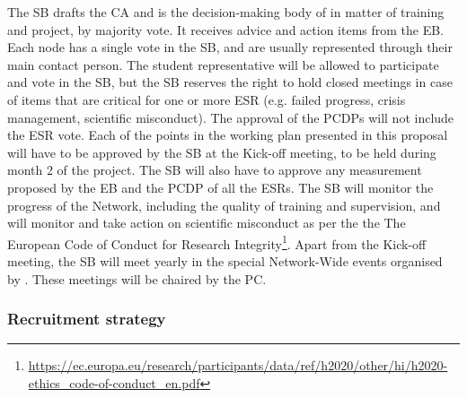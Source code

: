 The SB drafts the CA and is the decision-making body of \acronym in matter of training and project, by majority vote. 
It receives advice and action items from the EB. 
Each \acronym node has a single vote in the SB, and are usually represented through their main contact person.
The student representative will be allowed to participate and vote in the SB, but the SB reserves the right to hold closed meetings in case of items
that are critical for one or more ESR (e.g. failed progress, crisis management, scientific misconduct). The approval of the PCDPs will not include the ESR vote.
Each of the points in the working plan presented in this proposal will have to be approved by the SB
at the Kick-off meeting, to be held during month 2 of the project. The SB will also have to approve any measurement proposed by the EB and the PCDP of all the ESRs.
The SB will monitor the progress of the Network, including the quality of training and supervision,
and will monitor and take action on scientific misconduct as per the the The European
Code of Conduct for Research Integrity\footnote{\url{https://ec.europa.eu/research/participants/data/ref/h2020/other/hi/h2020-ethics_code-of-conduct_en.pdf}}. 
Apart from the Kick-off meeting, the SB will meet yearly in the special Network-Wide events
organised by \acronym. These meetings will be chaired by the PC.

\vspace{-2mm}
\subsubsection{Recruitment strategy}


